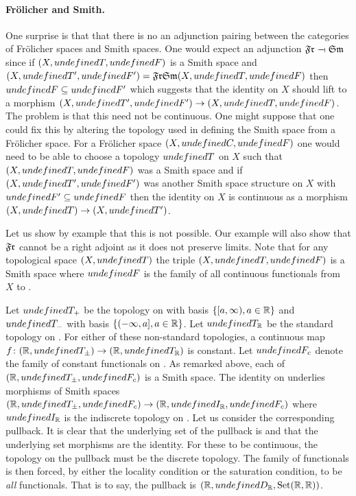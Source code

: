 \documentclass[%
a4paper,%
arxiv,%
defaults
]{myclass}
\begin{document}
\paragraph{Fr\"olicher and Smith.}
One surprise is that that there is no an adjunction pairing between the categories of Fr\"olicher spaces and Smith spaces.
One would expect an adjunction \(\SmFr \adjoint \FrSm\) since if \((X, \m{T}, \m{F})\) is a Smith space and
 \((X, \m{T}', \m{F}') = \SmFr\FrSm(X,\m{T},\m{F})\) then \(\m{F} \subseteq \m{F}'\) which suggests that the identity on \(X\) should lift to a morphism
 \((X, \m{T}', \m{F}') \to (X, \m{T}, \m{F})\).
The problem is that this need not be continuous.
One might suppose that one could fix this by altering the topology used in defining the Smith space from a Fr\"olicher space.
For a Fr\"olicher space \((X, \m{C}, \m{F})\) one would need to be able to choose a topology \(\m{T}\) on \(X\) such that \((X, \m{T}, \m{F})\) was a Smith space and if \((X, \m{T}', \m{F}')\) was another Smith space structure on \(X\) with
 \(\m{F}' \subseteq \m{F}\)
then the identity on \(X\) is continuous as a morphism
 \((X, \m{T}) \to (X, \m{T}')\).

\medskip

Let us show by example that this is not possible.
Our example will also show that \(\SmFr\) cannot be a right adjoint as it does not preserve limits.
Note that for any topological space \((X, \m{T})\) the triple \((X, \m{T}, \m{F})\) is a Smith space where \(\m{F}\) is the family of all continuous functionals from \(X\) to \R.

Let \(\m{T}_+\) be the topology on \R with basis
 \(\{[a, \infty), a \in \mathbb{R}\}\)
and \(\m{T}_-\) with basis
 \(\{(-\infty, a], a \in \mathbb{R}\}\).
Let \(\m{T}_{\R}\) be the standard topology on \R.
For either of these non\hyp{}standard topologies, a continuous map
 \(f \colon (\R, \m{T}_\pm) \to (\R, \m{T}_{\R})\)
is constant.
Let \(\m{F}_c\) denote the family of constant functionals on \R.
As remarked above, each of
 \((\R, \m{T}_\pm, \m{F}_c)\)
is a Smith space.
The identity on \R underlies morphisms of Smith spaces
 \((\R, \m{T}_\pm, \m{F}_c) \to (\R, \m{I}_{\R}, \m{F}_c)\)
where \(\m{I}_{\R}\) is the indiscrete topology on \R.
Let us consider the corresponding pullback.
It is clear that the underlying set of the pullback is \R and that the underlying set morphisms are the identity.
For these to be continuous, the topology on the pullback must be the discrete topology.
The family of functionals is then forced, by either the locality condition or the saturation condition, to be \emph{all} functionals.
That is to say, the pullback is
 \((\R, \m{D}_{\R}, \Set(\R,\R))\).
\end{document}
